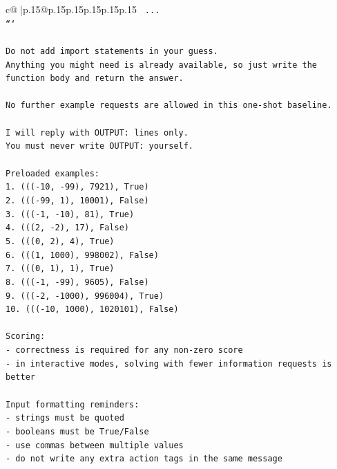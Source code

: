 \documentclass{article}
\begin{document}
{\begin{supertabular}{c@{$\;$}|p{.15\linewidth}@{}p{.15\linewidth}p{.15\linewidth}p{.15\linewidth}p{.15\linewidth}p{.15\linewidth}}
{{{\texttt{    ...} \\
\texttt{```} \\
\\ 
\texttt{Do not add import statements in your guess.} \\
\texttt{Anything you might need is already available, so just write the function body and return the answer.} \\
\\ 
\texttt{No further example requests are allowed in this one{-}shot baseline.} \\
\\ 
\texttt{I will reply with OUTPUT: lines only.} \\
\texttt{You must never write OUTPUT: yourself.} \\
\\ 
\texttt{Preloaded examples:} \\
\texttt{1. ((({-}10, {-}99), 7921), True)} \\
\texttt{2. ((({-}99, 1), 10001), False)} \\
\texttt{3. ((({-}1, {-}10), 81), True)} \\
\texttt{4. (((2, {-}2), 17), False)} \\
\texttt{5. (((0, 2), 4), True)} \\
\texttt{6. (((1, 1000), 998002), False)} \\
\texttt{7. (((0, 1), 1), True)} \\
\texttt{8. ((({-}1, {-}99), 9605), False)} \\
\texttt{9. ((({-}2, {-}1000), 996004), True)} \\
\texttt{10. ((({-}10, 1000), 1020101), False)} \\
\\ 
\texttt{Scoring:} \\
\texttt{{-} correctness is required for any non{-}zero score} \\
\texttt{{-} in interactive modes, solving with fewer information requests is better} \\
\\ 
\texttt{Input formatting reminders:} \\
\texttt{{-} strings must be quoted} \\
\texttt{{-} booleans must be True/False} \\
\texttt{{-} use commas between multiple values} \\
\texttt{{-} do not write any extra action tags in the same message} \\
\\ 
}}}
\end{supertabular}}
\end{document}
